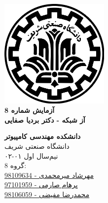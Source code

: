 \documentclass{article}
\begin{document}
\begin{titlepage}
	\begin{center}
		\vspace{0.2cm}
		
		\includegraphics[width=0.4\textwidth]{sharif.png}\\
		\vspace{0.2cm}
		\textbf{ \Huge{آزمایش شماره 8}}\\
		\vspace{0.25cm}
		\textbf{ \Large{آز شبکه - دکتر بردیا صفایی}}
		\vspace{0.2cm}
		
		
		\large \textbf{دانشکده مهندسی کامپیوتر}\\\vspace{0.1cm}
		\large   دانشگاه صنعتی شریف\\\vspace{0.2cm}
		\large   ﻧﯿﻢ‌سال اول ۰۱-۰۲ \\\vspace{0.10cm}
		\large{ گروه 8:}\\
		\large{\href{mailto:mehrshad.mirmohammadi@gmail.com}{مهرشاد میرمحمدی - 98109634}}\\
		\large{\href{mailto:parhaamsaremi@gmail.com}{پرهام صارمی - 97101959}}\\
		\large{\href{mailto:mofayezi.m@gmail.com}{محمدرضا مفیضی - 98106059}}\\
	\end{center}
\end{titlepage}

\newpage

\pagestyle{fancy}
\fancyhf{}
\fancyfoot{}
\setlength{\headheight}{59pt}
\cfoot{\thepage}
\end{document}
